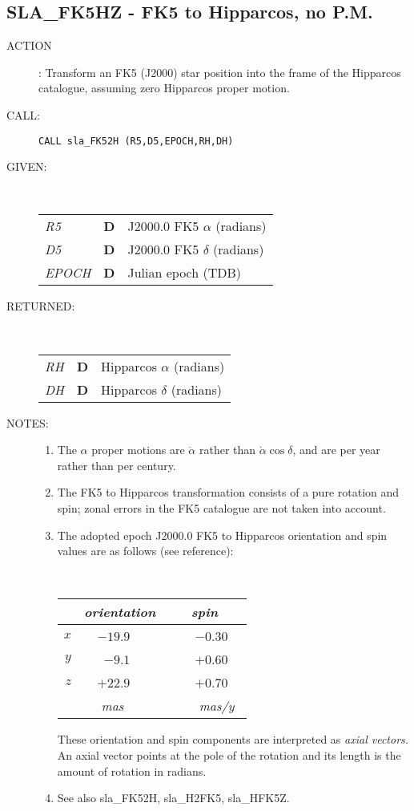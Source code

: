 \documentclass[11pt,twoside]{article}
\newcommand{\xlabel}[1]{}
\newcommand{\routine}[3]
{\hbadness=10000
  \vbox
  {
    \rule{\textwidth}{0.3mm}\\
    {\Large {\bf #1} \hfill #2 \hfill {\bf #1}}\\
    \setlength{\oldspacing}{\topsep}
    \setlength{\topsep}{0.3ex}
    \begin{description}
      #3
    \end{description}
    \setlength{\topsep}{\oldspacing}
  }
}
\renewcommand{\routine}[3]
   {
      \subsection{#1\xlabel{#1} - #2\label{#1}}
       \begin{description}
         #3
       \end{description}
   }
\newcommand{\action}[1]
{\item[ACTION]: #1}
\newcommand{\action}[1]
   {\item[ACTION:] #1}
\newcommand{\call}[1]
{\item[CALL]: \hspace{0.4em}{\tt #1}}
\newlength{\oldspacing}
\renewcommand{\call}[1]
   {
    \item[CALL:] {\tt #1}
   }
\newcommand{\args}[2]
{
  \goodbreak
  \setlength{\oldspacing}{\topsep}
  \setlength{\topsep}{0.3ex}
  \begin{description}
  \item[#1]:\\[1.5ex]
    \begin{tabular}{p{7em}p{6em}p{22em}}
      #2
    \end{tabular}
  \end{description}
  \setlength{\topsep}{\oldspacing}
}
\renewcommand{\args}[2]
   {
     \begin{description}
        \item[#1:]\\
        \begin{tabular}{p{7em}p{6em}l}
           #2
        \end{tabular}
     \end{description}
   }
\newcommand{\spec}[3]
{
  {\em {#1}} & {\bf \mbox{#2}} & {#3}
}
\newcommand{\notes}[1]
{
  \goodbreak
  \setlength{\oldspacing}{\topsep}
  \setlength{\topsep}{0.3ex}
  \begin{description}
    \item[NOTES]:
        #1
  \end{description}
  \setlength{\topsep}{\oldspacing}
}
\renewcommand{\notes}[1]
   {
      \begin{description}
         \item[NOTES:]
            #1
      \end{description}
   }
\begin{document}
\routine{SLA\_FK5HZ}{FK5 to Hipparcos, no P.M.}
{
 \action{Transform an FK5 (J2000) star position into the frame of the
         Hipparcos catalogue, assuming zero Hipparcos proper motion.}
 \call{CALL sla\_FK52H (R5,D5,EPOCH,RH,DH)}
}
\args{GIVEN}
{
 \spec{R5}{D}{J2000.0 FK5 $\alpha$ (radians)} \\
 \spec{D5}{D}{J2000.0 FK5 $\delta$ (radians)} \\
 \spec{EPOCH}{D}{Julian epoch (TDB)}
}
\args{RETURNED}
{
 \spec{RH}{D}{Hipparcos $\alpha$ (radians)} \\
 \spec{DH}{D}{Hipparcos $\delta$ (radians)}
}
\notes
{
 \begin{enumerate}
  \item The $\alpha$ proper motions are $\dot{\alpha}$ rather than
        $\dot{\alpha}\cos\delta$, and are per year rather than per century.
  \item The FK5 to Hipparcos
        transformation consists of a pure rotation and spin;
        zonal errors in the FK5 catalogue are not taken into account.
  \item The adopted epoch J2000.0 FK5 to Hipparcos orientation and spin
        values are as follows (see reference):

        \vspace{2ex}

        ~~~~~~~~~~~~
        \begin{tabular}{|r|r|r|} \hline
        &
        \multicolumn{1}{|c}{\it orientation} &
        \multicolumn{1}{|c|}{\it ~~~spin~~~} \\ \hline
        $x$ & $-19.9$~~~~ & ~$-0.30$~~ \\
        $y$ &  $-9.1$~~~~ & ~$+0.60$~~ \\
        $z$ & $+22.9$~~~~ & ~$+0.70$~~ \\ \hline
        & {\it mas}~~~~~ & ~{\it mas/y}~ \\ \hline
        \end{tabular}

        \vspace{3ex}

        These orientation and spin components are interpreted as
        {\it axial vectors.}  An axial vector points at the pole of
        the rotation and its length is the amount of rotation in radians.
  \item See also sla\_FK52H, sla\_H2FK5, sla\_HFK5Z.
 \end{enumerate}
}
\end{document}
